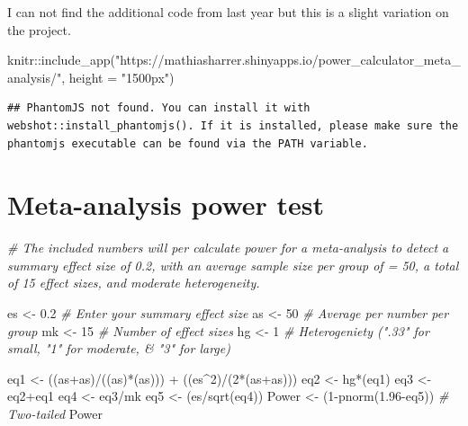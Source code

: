 \documentclass[
]{book}
\newenvironment{Shaded}{\begin{snugshade}}{\end{snugshade}}
\newcommand{\AttributeTok}[1]{\textcolor[rgb]{0.77,0.63,0.00}{#1}}
\newcommand{\CommentTok}[1]{\textcolor[rgb]{0.56,0.35,0.01}{\textit{#1}}}
\newcommand{\DecValTok}[1]{\textcolor[rgb]{0.00,0.00,0.81}{#1}}
\newcommand{\FloatTok}[1]{\textcolor[rgb]{0.00,0.00,0.81}{#1}}
\newcommand{\FunctionTok}[1]{\textcolor[rgb]{0.00,0.00,0.00}{#1}}
\newcommand{\NormalTok}[1]{#1}
\newcommand{\OtherTok}[1]{\textcolor[rgb]{0.56,0.35,0.01}{#1}}
\newcommand{\SpecialCharTok}[1]{\textcolor[rgb]{0.00,0.00,0.00}{#1}}
\newcommand{\StringTok}[1]{\textcolor[rgb]{0.31,0.60,0.02}{#1}}
\begin{document}
I can not find the additional code from last year but this is a slight variation on the project.

\begin{Shaded}
\begin{Highlighting}[]
\NormalTok{knitr}\SpecialCharTok{::}\FunctionTok{include\_app}\NormalTok{(}\StringTok{"https://mathiasharrer.shinyapps.io/power\_calculator\_meta\_analysis/"}\NormalTok{, }\AttributeTok{height =} \StringTok{"1500px"}\NormalTok{) }
\end{Highlighting}
\end{Shaded}

\begin{verbatim}
## PhantomJS not found. You can install it with webshot::install_phantomjs(). If it is installed, please make sure the phantomjs executable can be found via the PATH variable.
\end{verbatim}

\hypertarget{meta-analysis-power-test}{%
\section{Meta-analysis power test}\label{meta-analysis-power-test}}

\begin{Shaded}
\begin{Highlighting}[]
\CommentTok{\# The included numbers will per calculate power for a meta{-}analysis to detect a summary effect size of 0.2, with an average sample size per group of = 50, a total of 15 effect sizes, and moderate heterogeneity.}

\NormalTok{es }\OtherTok{\textless{}{-}} \FloatTok{0.2} \CommentTok{\# Enter your summary effect size}
\NormalTok{as }\OtherTok{\textless{}{-}} \DecValTok{50}  \CommentTok{\# Average per number per group}
\NormalTok{mk }\OtherTok{\textless{}{-}} \DecValTok{15}  \CommentTok{\# Number of effect sizes}
\NormalTok{hg }\OtherTok{\textless{}{-}} \DecValTok{1}   \CommentTok{\# Heterogeniety (".33" for small, "1" for moderate, \& "3" for large)}

\NormalTok{eq1 }\OtherTok{\textless{}{-}}\NormalTok{ ((as}\SpecialCharTok{+}\NormalTok{as)}\SpecialCharTok{/}\NormalTok{((as)}\SpecialCharTok{*}\NormalTok{(as))) }\SpecialCharTok{+}\NormalTok{ ((es}\SpecialCharTok{\^{}}\DecValTok{2}\NormalTok{)}\SpecialCharTok{/}\NormalTok{(}\DecValTok{2}\SpecialCharTok{*}\NormalTok{(as}\SpecialCharTok{+}\NormalTok{as)))}
\NormalTok{eq2 }\OtherTok{\textless{}{-}}\NormalTok{ hg}\SpecialCharTok{*}\NormalTok{(eq1)}
\NormalTok{eq3 }\OtherTok{\textless{}{-}}\NormalTok{ eq2}\SpecialCharTok{+}\NormalTok{eq1}
\NormalTok{eq4 }\OtherTok{\textless{}{-}}\NormalTok{ eq3}\SpecialCharTok{/}\NormalTok{mk}
\NormalTok{eq5 }\OtherTok{\textless{}{-}}\NormalTok{ (es}\SpecialCharTok{/}\FunctionTok{sqrt}\NormalTok{(eq4))}
\NormalTok{Power }\OtherTok{\textless{}{-}}\NormalTok{ (}\DecValTok{1}\SpecialCharTok{{-}}\FunctionTok{pnorm}\NormalTok{(}\FloatTok{1.96}\SpecialCharTok{{-}}\NormalTok{eq5)) }\CommentTok{\# Two{-}tailed}
\NormalTok{Power}
\end{Highlighting}
\end{Shaded}
\end{document}
